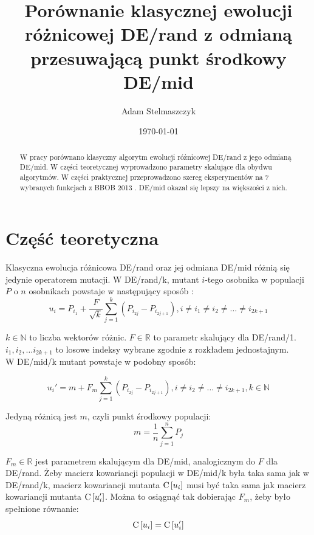 \documentclass[12pt, a4paper]{article}
\title{\textbf{Porównanie klasycznej ewolucji różnicowej DE/rand z odmianą przesuwającą punkt środkowy DE/mid}}
\author{Adam Stelmaszczyk}
\date{\today}
\def\C{{\rm C}\,}
\begin{document}
\maketitle

\begin{abstract}
W pracy porównano klasyczny algorytm ewolucji różnicowej DE/rand z jego odmianą DE/mid.
W części teoretycznej wyprowadzono parametry skalujące dla obydwu algorytmów. W części praktycznej
przeprowadzono szereg eksperymentów na 7 wybranych funkcjach z BBOB 2013 \cite{hansen}. DE/mid
okazał się lepszy na większości z nich.
\end{abstract}

\section{Część teoretyczna}

Klasyczna ewolucja różnicowa DE/rand oraz jej odmiana DE/mid różnią się jedynie operatorem mutacji.
W DE/rand/k, mutant $i$-tego osobnika w populacji $P$ o $n$ osobnikach powstaje w następujący sposób \cite{opara}:
\begin{equation} \label{eq:derand}
u_i = P_{i_1} + \frac{F}{\sqrt{k}}\sum\limits_{j=1}^k (P_{i_{2j}} - P_{i_{2j+1}}),
i \neq i_1 \neq i_2 \neq \dots \neq i_{2k+1}
\end{equation}

$k \in \mathbb{N}$ to liczba wektorów różnic. $F\in\mathbb{R}$ to parametr skalujący dla DE/rand/1. 
$i_1, i_2, \dots i_{2k+1}$ to losowe indeksy wybrane zgodnie z rozkładem jednostajnym.\\

W DE/mid/k mutant powstaje w podobny sposób:

\begin{equation} \label{eq:demid}
u_i' = m + F_m\sum\limits_{j=1}^k (P_{i_{2j}} - P_{i_{2j+1}}), 
i \neq i_2 \neq \dots \neq i_{2k+1}, k \in \mathbb{N}
\end{equation}

Jedyną różnicą jest $m$, czyli punkt środkowy populacji:
\begin{equation} \label{eq:midpoint}
m = \frac{1}{n}\sum\limits_{j=1}^n P_j
\end{equation}

$F_m\in\mathbb{R}$ jest parametrem skalującym dla DE/mid, analogicznym do $F$ dla DE/rand. 
Żeby macierz kowariancji populacji w DE/mid/k była taka sama jak w DE/rand/k, 
macierz kowariancji mutanta $\C[u_i]$ musi być taka sama jak macierz kowariancji mutanta $\C[u_i']$.
Można to osiągnąć tak dobierając $F_m$, żeby było spełnione równanie:
\begin{equation} \label{eq:rownanie}
\C[u_i] = \C[u_i']
\end{equation}
\end{document}
